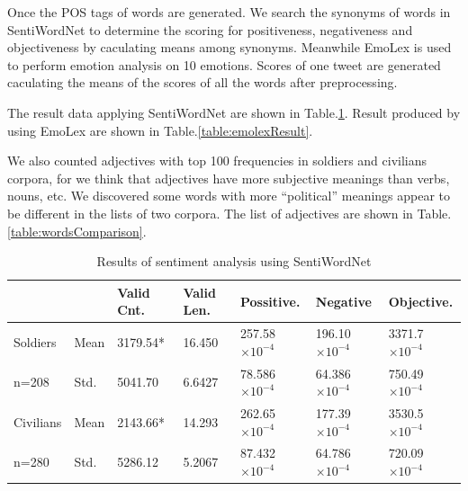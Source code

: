 Once the POS tags of words are generated. We search the synonyms of words in SentiWordNet to determine the scoring for positiveness, negativeness and objectiveness by caculating means among synonyms. Meanwhile EmoLex is used to perform emotion analysis on 10 emotions. Scores of one tweet are generated caculating the means of the scores of all the words after preprocessing.

The result data applying SentiWordNet are shown in Table.\ref{table:sentiResult}.
Result produced by using EmoLex are shown in Table.\ref{table:emolexResult}.

We also counted adjectives with top 100 frequencies in soldiers and civilians corpora, for we think that adjectives have more subjective meanings than verbs, nouns, etc. We discovered some words with more \enquote{political} meanings appear to be different in the lists of two corpora. The list of adjectives are shown in Table.\ref{table:wordsComparison}.


\begin{table}[h]
  \caption{Results of sentiment analysis using SentiWordNet}
  \label{table:sentiResult}
  \centering
  \renewcommand{\tabularxcolumn}{m} %
  \begin{tabularx}{\textwidth}{l l | l l l l l}
    \toprule
              &      & \textbf{Valid Cnt.} & \textbf{Valid Len.} & \textbf{Possitive.}    & \textbf{Negative}      & \textbf{Objective.}
    \tabularnewline \midrule
    Soldiers  & Mean & 3179.54*            & 16.450              & 257.58$\times 10^{-4}$ & 196.10$\times 10^{-4}$ & 3371.7$\times 10^{-4}$
    \tabularnewline
    n=208     & Std. & 5041.70             & 6.6427              & 78.586$\times 10^{-4}$ & 64.386$\times 10^{-4}$ & 750.49$\times 10^{-4}$
    \tabularnewline \hline \hline
    Civilians & Mean & 2143.66*            & 14.293              & 262.65$\times 10^{-4}$ & 177.39$\times 10^{-4}$ & 3530.5$\times 10^{-4}$
    \tabularnewline
    n=280     & Std. & 5286.12             & 5.2067              & 87.432$\times 10^{-4}$ & 64.786$\times 10^{-4}$ & 720.09$\times 10^{-4}$
    \tabularnewline \bottomrule
  \end{tabularx}
\end{table}


